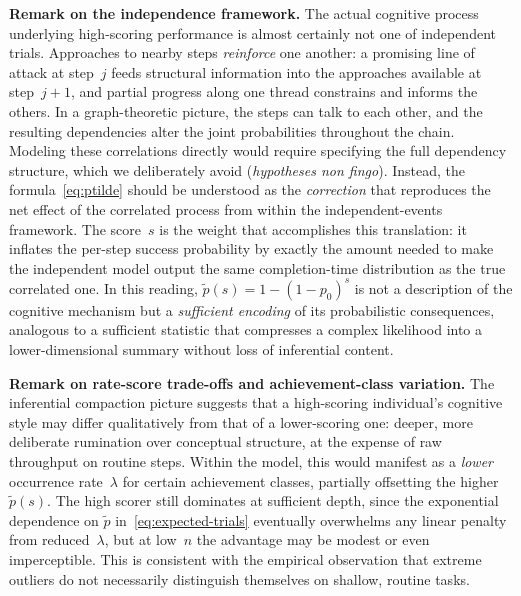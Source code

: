 \documentclass{article}
\begin{document}
\medskip
\noindent\textbf{Remark on the independence framework.}\;
The actual cognitive process underlying high-scoring performance is
almost certainly not one of independent trials. Approaches to nearby
steps \emph{reinforce} one another: a promising line of attack at
step~$j$ feeds structural information into the approaches available at
step~$j+1$, and partial progress along one thread constrains and informs
the others. In a graph-theoretic picture, the steps can talk to each
other, and the resulting dependencies alter the joint probabilities
throughout the chain. Modeling these correlations directly would require
specifying the full dependency structure, which we deliberately avoid
(\emph{hypotheses non fingo}).
Instead, the formula~\eqref{eq:ptilde} should be understood as the
\emph{correction} that reproduces the net effect of the correlated
process from within the independent-events framework. The score~$s$ is
the weight that accomplishes this translation: it inflates the per-step
success probability by exactly the amount needed to make the independent
model output the same completion-time distribution as the true correlated
one. In this reading, $\widetilde{p}(s) = 1 - (1-p_0)^s$ is not a
description of the cognitive mechanism but a \emph{sufficient encoding}
of its probabilistic consequences, analogous to a sufficient statistic
that compresses a complex likelihood into a lower-dimensional summary
without loss of inferential content.

\medskip
\noindent\textbf{Remark on rate-score trade-offs and achievement-class variation.}\;
The inferential compaction picture suggests that a high-scoring
individual's cognitive style may differ qualitatively from that of a
lower-scoring one: deeper, more deliberate rumination over
conceptual structure, at the expense of raw throughput on routine
steps. Within the model, this would manifest as a \emph{lower}
occurrence rate~$\lambda$ for certain achievement classes, partially
offsetting the higher~$\widetilde{p}(s)$. The high scorer still
dominates at sufficient depth, since the exponential dependence on
$\widetilde{p}$ in~\eqref{eq:expected-trials} eventually overwhelms
any linear penalty from reduced~$\lambda$, but at low~$n$ the
advantage may be modest or even imperceptible. This is consistent
with the empirical observation that extreme outliers do not necessarily
distinguish themselves on shallow, routine tasks.
\end{document}
